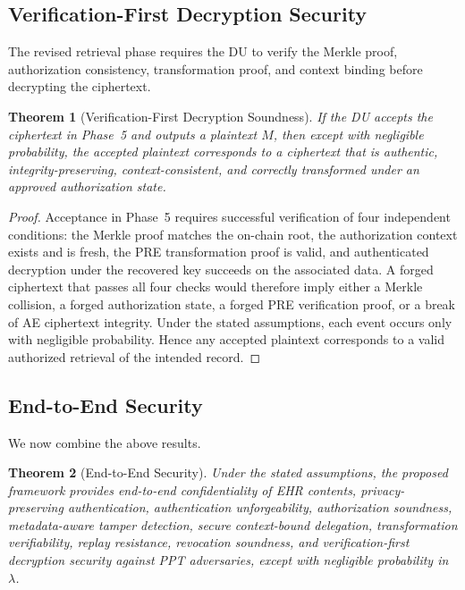 \documentclass[conference]{IEEEtran}
\newtheorem{theorem}{Theorem}
\begin{document}
\subsection{Verification-First Decryption Security}

The revised retrieval phase requires the DU to verify the Merkle proof, authorization consistency, transformation proof, and context binding before decrypting the ciphertext.

\begin{theorem}[Verification-First Decryption Soundness]
If the DU accepts the ciphertext in Phase~5 and outputs a plaintext $M$, then except with negligible probability, the accepted plaintext corresponds to a ciphertext that is authentic, integrity-preserving, context-consistent, and correctly transformed under an approved authorization state.
\end{theorem}

\begin{proof}
Acceptance in Phase~5 requires successful verification of four independent conditions: the Merkle proof matches the on-chain root, the authorization context exists and is fresh, the PRE transformation proof is valid, and authenticated decryption under the recovered key succeeds on the associated data. A forged ciphertext that passes all four checks would therefore imply either a Merkle collision, a forged authorization state, a forged PRE verification proof, or a break of AE ciphertext integrity. Under the stated assumptions, each event occurs only with negligible probability. Hence any accepted plaintext corresponds to a valid authorized retrieval of the intended record.
\end{proof}

\subsection{End-to-End Security}

We now combine the above results.

\begin{theorem}[End-to-End Security]
Under the stated assumptions, the proposed framework provides end-to-end confidentiality of EHR contents, privacy-preserving authentication, authentication unforgeability, authorization soundness, metadata-aware tamper detection, secure context-bound delegation, transformation verifiability, replay resistance, revocation soundness, and verification-first decryption security against PPT adversaries, except with negligible probability in $\lambda$.
\end{theorem}
\end{document}
